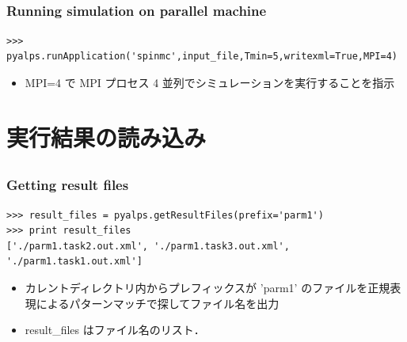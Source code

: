 \subsection*{\redm\whitem\greenb}
\begin{frame}[t,fragile]
\frametitle{Running simulation on parallel machine}
\begin{lstlisting}
>>> pyalps.runApplication('spinmc',input_file,Tmin=5,writexml=True,MPI=4)
\end{lstlisting}
\begin{itemize}
\item MPI=4 で MPI プロセス 4 並列でシミュレーションを実行することを指示
\end{itemize}
\end{frame}

\section{実行結果の読み込み}

\subsection*{\redm\whiteb\greenb}
\begin{frame}[t,fragile]
 \frametitle{Getting result files}
\begin{lstlisting}
>>> result_files = pyalps.getResultFiles(prefix='parm1')
>>> print result_files
['./parm1.task2.out.xml', './parm1.task3.out.xml', './parm1.task1.out.xml']
\end{lstlisting}
 \begin{itemize}
  \item カレントディレクトリ内からプレフィックスが 'parm1' のファイルを正規表現によるパターンマッチで探してファイル名を出力
  \item result\_files はファイル名のリスト．
 \end{itemize}
\end{frame}

